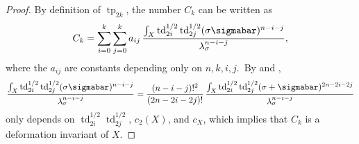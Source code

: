 \documentclass[12pt]{amsart}
\DeclareMathOperator{\td}{td}
\DeclareMathOperator{\tp}{tp}
\theoremstyle{remark}
\begin{document}
\begin{proof}
By  definition of $\tp_{2k}$, the number $C_k$ can be written as
\[C_k=\sum_{i=0}^k\sum_{j=0}^ka_{ij}\,\frac{\int_X\td^{1/2}_{2i}\td^{1/2}_{2j}(\sigma\sigmabar)^{n-i-j}}{\lambda_{\sigma}^{n-i-j}},\]
where the $a_{ij}$ are constants depending only on $n,k,i,j$.\ By \cite[Corollary~23.17]{huy} and \cite[Proposition~2.3]{jia},  \[\frac{\int_X\td^{1/2}_{2i}\td^{1/2}_{2j}(\sigma\sigmabar)^{n-i-j}}{\lambda_{\sigma}^{n-i-j}}=\frac{(n-i-j)!^2}{(2n-2i-2j)!}\,\frac{\int_X\td^{1/2}_{2i}\td^{1/2}_{2j}(\sigma+\sigmabar)^{2n-2i-2j}}{\lambda_{\sigma}^{n-i-j}}\]
 only depends  on $\td^{1/2}_{2i}\td^{1/2}_{2j}$, $c_2(X)$, and $c_X$, which implies that $C_k$ is a  deformation invariant of $X$. 
\end{proof}
\end{document}
